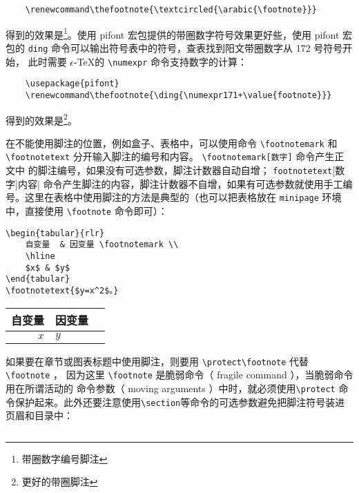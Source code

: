 {\begin{lstlisting}
    \renewcommand\thefootnote{\textcircled{\arabic{\footnote}}}
\end{lstlisting}
\renewcommand\thefootnote{\textcircled{\arabic{footnote}}}

得到的效果是\footnote{带圈数字编号脚注}。使用  pifont 宏包提供的带圈数字符号效果更好些，使用 pifont 宏包的 \verb|ding| 命令可以输出符号表中的符号，查表找到阳文带圈数字从 172 号符号开始，
此时需要 $\epsilon$-\TeX 的 \verb|\numexpr| 命令支持数字的计算：
\begin{lstlisting}
    \usepackage{pifont}
    \renewcommand\thefootnote{\ding{\numexpr171+\value{footnote}}}
\end{lstlisting}
\renewcommand\thefootnote{\ding{\numexpr171+\value{footnote}}}

得到的效果是\footnote{更好的带圈脚注}。

在不能使用脚注的位置，例如盒子、表格中，可以使用命令 \verb|\footnotemark| 和 \verb|\footnotetext| 分开输入脚注的编号和内容。 \verb|\footnotemark[数字]| 命令产生正文中
的脚注编号，如果没有可选参数，脚注计数器自动自增； \verb|footnotetext|[数字]{内容}|
命令产生脚注的内容，脚注计数器不自增，如果有可选参数就使用手工编号。这里在表格中使用脚注的方法是典型的（也可以把表格放在 \verb|minipage| 环境中，直接使用 \verb|\footnote| 命令即可）：
\begin{lstlisting}
\begin{tabular}{rlr}
    自变量  & 因变量 \footnotemark \\ 
    \hline
    $x$ & $y$
\end{tabular}
\footnotetext{$y=x^2$。}
\end{lstlisting}

\begin{tabular}{rlr}
    自变量  & 因变量 \footnotemark \\ 
    \hline
    $x$ & $y$
\end{tabular}

如果要在章节或图表标题中使用脚注，则要用 \verb|\protect\footnote| 代替\\ \verb|\footnote| ，
因为这里 \verb|\footnote| 是脆弱命令（ fragile command ），当脆弱命令用在所谓活动的
命令参数（ moving arguments ）中时，就必须使用\verb|\protect| 命令保护起来。此外还要注意使用\verb|\section|等命令的可选参数避免把脚注符号装进页眉和目录中：
\begin{lstlisting}

\end{lstlisting}}

